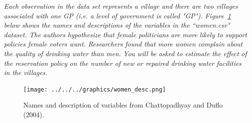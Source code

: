 \documentclass[12pt,letterpaper]{article}
\begin{document}
\noindent \textit{Each observation in the data set represents a village and there are two villages associated with one GP (i.e. a level of government is called "GP"). Figure~\ref{fig:women_desc} below shows the names and descriptions of the variables in the ``women.csv" dataset. The authors hypothesize that female politicians are more likely to support policies female voters want. Researchers found that more women complain about the quality of drinking water than men. You will be asked to estimate the effect of the reservation policy on the number of new or repaired drinking water facilities in the villages.}
\vspace{.5cm}
\begin{figure}[h!]
	\caption{\footnotesize{Names and description of variables from Chattopadhyay and Duflo (2004).}}
	\centering
	\label{fig:women_desc}
	\texttt{[image: ../../../graphics/women\_desc.png]}
\end{figure}		
\newpage
\end{document}
